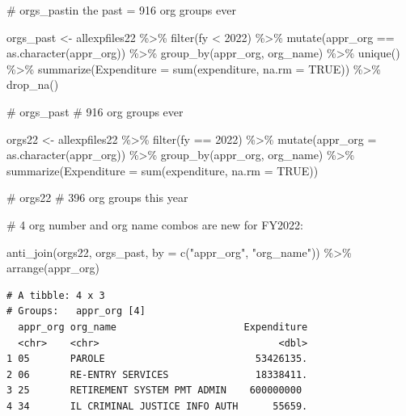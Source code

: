 \documentclass[
  letterpaper,
  DIV=11,
  numbers=noendperiod]{scrreport}
\newenvironment{Shaded}{\begin{snugshade}}{\end{snugshade}}
\newcommand{\AttributeTok}[1]{\textcolor[rgb]{0.40,0.45,0.13}{#1}}
\newcommand{\CommentTok}[1]{\textcolor[rgb]{0.37,0.37,0.37}{#1}}
\newcommand{\ConstantTok}[1]{\textcolor[rgb]{0.56,0.35,0.01}{#1}}
\newcommand{\DecValTok}[1]{\textcolor[rgb]{0.68,0.00,0.00}{#1}}
\newcommand{\FunctionTok}[1]{\textcolor[rgb]{0.28,0.35,0.67}{#1}}
\newcommand{\NormalTok}[1]{\textcolor[rgb]{0.00,0.23,0.31}{#1}}
\newcommand{\OtherTok}[1]{\textcolor[rgb]{0.00,0.23,0.31}{#1}}
\newcommand{\SpecialCharTok}[1]{\textcolor[rgb]{0.37,0.37,0.37}{#1}}
\newcommand{\StringTok}[1]{\textcolor[rgb]{0.13,0.47,0.30}{#1}}
\begin{document}
\begin{Shaded}
\begin{Highlighting}[]
\CommentTok{\# orgs\_pastin the past =  916 org groups ever}

\NormalTok{orgs\_past }\OtherTok{\textless{}{-}}\NormalTok{ allexpfiles22  }\SpecialCharTok{\%\textgreater{}\%} 
  \FunctionTok{filter}\NormalTok{(fy }\SpecialCharTok{\textless{}} \DecValTok{2022}\NormalTok{) }\SpecialCharTok{\%\textgreater{}\%} 
  \FunctionTok{mutate}\NormalTok{(appr\_org }\SpecialCharTok{==} \FunctionTok{as.character}\NormalTok{(appr\_org)) }\SpecialCharTok{\%\textgreater{}\%} 
  \FunctionTok{group\_by}\NormalTok{(appr\_org, org\_name) }\SpecialCharTok{\%\textgreater{}\%} 
  \FunctionTok{unique}\NormalTok{() }\SpecialCharTok{\%\textgreater{}\%} 
  \FunctionTok{summarize}\NormalTok{(}\AttributeTok{Expenditure =} \FunctionTok{sum}\NormalTok{(expenditure, }\AttributeTok{na.rm =} \ConstantTok{TRUE}\NormalTok{)) }\SpecialCharTok{\%\textgreater{}\%} \FunctionTok{drop\_na}\NormalTok{()}

\CommentTok{\# orgs\_past \# 916 org groups ever}

\NormalTok{orgs22 }\OtherTok{\textless{}{-}}\NormalTok{ allexpfiles22  }\SpecialCharTok{\%\textgreater{}\%} 
  \FunctionTok{filter}\NormalTok{(fy }\SpecialCharTok{==} \DecValTok{2022}\NormalTok{) }\SpecialCharTok{\%\textgreater{}\%} 
  \FunctionTok{mutate}\NormalTok{(}\AttributeTok{appr\_org =} \FunctionTok{as.character}\NormalTok{(appr\_org)) }\SpecialCharTok{\%\textgreater{}\%} 
  \FunctionTok{group\_by}\NormalTok{(appr\_org, org\_name) }\SpecialCharTok{\%\textgreater{}\%} 
  \FunctionTok{summarize}\NormalTok{(}\AttributeTok{Expenditure =} \FunctionTok{sum}\NormalTok{(expenditure, }\AttributeTok{na.rm =} \ConstantTok{TRUE}\NormalTok{))}

\CommentTok{\# orgs22 \# 396 org groups this year}

\CommentTok{\# 4 org number and org name combos are new for FY2022:}

\FunctionTok{anti\_join}\NormalTok{(orgs22, orgs\_past, }\AttributeTok{by =} \FunctionTok{c}\NormalTok{(}\StringTok{"appr\_org"}\NormalTok{, }\StringTok{"org\_name"}\NormalTok{)) }\SpecialCharTok{\%\textgreater{}\%} \FunctionTok{arrange}\NormalTok{(appr\_org)}
\end{Highlighting}
\end{Shaded}

\begin{verbatim}
# A tibble: 4 x 3
# Groups:   appr_org [4]
  appr_org org_name                      Expenditure
  <chr>    <chr>                               <dbl>
1 05       PAROLE                          53426135.
2 06       RE-ENTRY SERVICES               18338411.
3 25       RETIREMENT SYSTEM PMT ADMIN    600000000 
4 34       IL CRIMINAL JUSTICE INFO AUTH      55659.
\end{verbatim}
\end{document}
